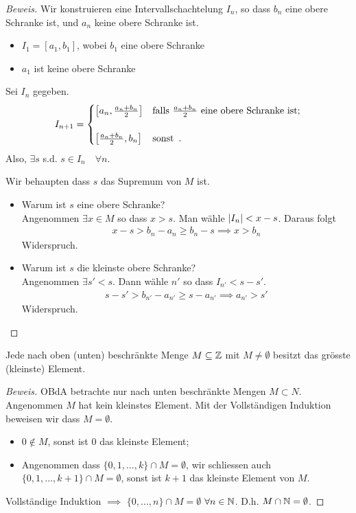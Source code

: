 \begin{proof}[Beweis]
  Wir konstruieren eine Intervallschachtelung $I_n$, so dass $b_n$ eine obere Schranke ist, und $a_n$ keine obere Schranke ist.
  \begin{itemize}
    \item $I_1=[a_1, b_1]$, wobei $b_1$ eine obere Schranke
    \item $a_1$ ist keine obere Schranke
  \end{itemize}
  Sei $I_n$ gegeben. 
  \begin{align*}
    I_{n+1} = \begin{cases}
      \left[ a_n,\frac{a_n+b_n}{2} \right]&\text{falls $\frac{a_n+b_n}{2}$ eine obere Schranke ist;}\\ \\
      \left[ \frac{a_n+b_n}{2}, b_n \right]&\text{sonst\, .}
    \end{cases}
  \end{align*}
  Also, $\exists s$ s.d. $s\in I_n\quad \forall n$.

Wir behaupten dass $s$ das Supremum von $M$ ist.
  \begin{itemize}
    \item Warum ist $s$ eine obere Schranke? \\
    Angenommen $\exists x\in M$ so dass $x>s$. Man wähle $\mathopen| I_n \mathclose|<x-s$. Daraus folgt
    \begin{align*}
      x-s>b_n-a_n \geq b_n-s \implies x>b_n
    \end{align*}
    Widerspruch.
  \item Warum ist $s$ die kleinste obere Schranke?\\
    Angenommen $\exists s'<s$. Dann wähle $n'$ so dass $I_{n'} <s-s'$.
    \begin{align*}
      s-s'>b_{n'}-a_{n'}\geq s-a_{n'} \implies a_{n'}>s'
    \end{align*}
    Widerspruch.
  \end{itemize}
\end{proof}
\begin{Lem}\label{l:Voll}
  Jede nach oben (unten) beschränkte Menge $M\subseteq \mathbb{Z}$ mit $M\neq \emptyset$
besitzt das grösste (kleinste) Element.
\end{Lem}
\begin{proof}[Beweis]
OBdA betrachte nur nach unten beschränkte Mengen $M\subset N$. Angenommen $M$ hat kein kleinstes Element.
Mit der Vollst\"andigen Induktion beweisen wir dass $M=\emptyset$. 
\begin{itemize}
 \item $0\not\in M$, sonst ist $0$ das kleinste Element;
\item Angenommen dass $\{0, 1, \ldots, k\}\cap M=\emptyset$, wir schliessen auch
$\{0, 1, \ldots, k+1\}\cap M =\emptyset$, sonst ist $k+1$ das kleinste Element von $M$.
\end{itemize}
Vollst\"andige Induktion $\implies$ $\{0, \ldots, n\}\cap M=\emptyset$ $\forall n\in \mathbb{N}$.
D.h. $M\cap \mathbb{N}=\emptyset$.
\end{proof}

